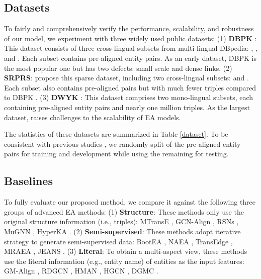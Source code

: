 \documentclass[sigconf]{acmart}
\begin{document}
\subsection{Datasets}
To fairly and comprehensively verify the performance, scalability, and robustness of our model, we experiment with three widely used public datasets:
(1) \textbf{DBPK} \cite{DBLP:conf/semweb/SunHL17}:
This dataset consists of three cross-lingual subsets from multi-lingual DBpedia: , , and .
Each subset contains  pre-aligned entity pairs.
As an early dataset, DBPK is the most popular one but has two defects: small scale and dense links.
(2) \textbf{SRPRS}:
\citet{DBLP:conf/icml/GuoSH19} propose this sparse dataset, including two cross-lingual subsets:  and .
Each subset also contains  pre-aligned pairs but with much fewer triples compared to DBPK .
(3) \textbf{DWYK} \cite{DBLP:conf/ijcai/SunHZQ18}:
This dataset comprises two mono-lingual subsets, each containing  pre-aligned entity pairs and nearly one million triples.
As the largest dataset,  raises challenges to the scalability of EA models.

The statistics of these datasets are summarized in Table \ref{dataset}.
To be consistent with previous studies \cite{DBLP:conf/emnlp/WangLLZ18,DBLP:conf/ijcai/SunHZQ18,DBLP:conf/ijcai/WuLF0Y019,DBLP:conf/wsdm/MaoWXLW20}, we randomly split  of the pre-aligned entity pairs for training and development while using the remaining  for testing.

\vspace{-1em}
\subsection{Baselines}
To fully evaluate our proposed method, we compare it against the following three groups of advanced EA methods:
(1) \textbf{Structure}:
These methods only use the original structure information (i.e., triples):
MTransE \cite{DBLP:conf/ijcai/ChenTYZ17}, GCN-Align \cite{DBLP:conf/emnlp/WangLLZ18}, RSNs \cite{DBLP:conf/icml/GuoSH19}, MuGNN \cite{DBLP:conf/acl/CaoLLLLC19}, HyperKA \cite{DBLP:conf/emnlp/SunCHWDZ20}.
(2) \textbf{Semi-supervised}:
These methods adopt iterative strategy to generate semi-supervised data:
BootEA \cite{DBLP:conf/ijcai/SunHZQ18}, NAEA \cite{DBLP:conf/ijcai/ZhuZ0TG19}, TransEdge \cite{DBLP:journals/corr/abs-2004-13579}, MRAEA \cite{DBLP:conf/wsdm/MaoWXLW20}, JEANS \cite{DBLP:conf/eacl/ChenSZR21}.
(3) \textbf{Literal}:
To obtain a multi-aspect view, these methods use the literal information (e.g., entity name) of entities as the input features:
GM-Align \cite{DBLP:conf/acl/XuWYFSWY19}, RDGCN \cite{DBLP:conf/ijcai/WuLF0Y019}, HMAN \cite{DBLP:conf/emnlp/YangZSLLS19}, HGCN \cite{DBLP:conf/emnlp/WuLFWZ19}, DGMC \cite{DBLP:conf/iclr/FeyL0MK20}.
\end{document}
